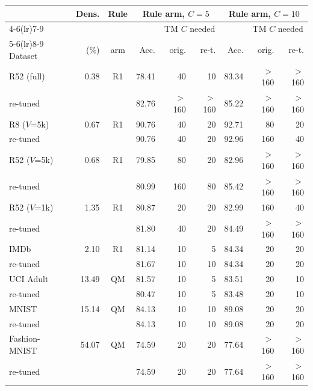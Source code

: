 \begin{tabular}{lrcrrrrrr}
\toprule
 & Dens. & Rule & \multicolumn{3}{c}{Rule arm, $C = 5$} & \multicolumn{3}{c}{Rule arm, $C = 10$} \\
\cmidrule(lr){4-6}\cmidrule(lr){7-9}
 & & & & \multicolumn{2}{c}{TM $C$ needed} & & \multicolumn{2}{c}{TM $C$ needed} \\
\cmidrule(lr){5-6}\cmidrule(lr){8-9}
Dataset & (\%) & arm & Acc. & orig. & re-t. & Acc. & orig. & re-t. \\
\midrule
R52 (full) & 0.38 & R1 & 78.41 & 40 & 10 & 83.34 & $>$160 & $>$160 \\
{\color{blue}\quad re-tuned} &  &  & {\color{blue}82.76} & {\color{blue}$>$160} & {\color{blue}$>$160} & {\color{blue}85.22} & {\color{blue}$>$160} & {\color{blue}$>$160} \\
R8 ($V$=5k) & 0.67 & R1 & 90.76 & 40 & 20 & 92.71 & 80 & 20 \\
{\color{blue}\quad re-tuned} &  &  & {\color{blue}90.76} & {\color{blue}40} & {\color{blue}20} & {\color{blue}92.96} & {\color{blue}160} & {\color{blue}40} \\
R52 ($V$=5k) & 0.68 & R1 & 79.85 & 80 & 20 & 82.96 & $>$160 & $>$160 \\
{\color{blue}\quad re-tuned} &  &  & {\color{blue}80.99} & {\color{blue}160} & {\color{blue}80} & {\color{blue}85.42} & {\color{blue}$>$160} & {\color{blue}$>$160} \\
R52 ($V$=1k) & 1.35 & R1 & 80.87 & 20 & 20 & 82.99 & 160 & 40 \\
{\color{blue}\quad re-tuned} &  &  & {\color{blue}81.80} & {\color{blue}40} & {\color{blue}20} & {\color{blue}84.49} & {\color{blue}$>$160} & {\color{blue}$>$160} \\
IMDb & 2.10 & R1 & 81.14 & 10 & 5 & 84.34 & 20 & 20 \\
{\color{blue}\quad re-tuned} &  &  & {\color{blue}81.67} & {\color{blue}10} & {\color{blue}10} & {\color{blue}84.34} & {\color{blue}20} & {\color{blue}20} \\
UCI Adult & 13.49 & QM & 81.57 & 10 & 5 & 83.51 & 20 & 10 \\
{\color{blue}\quad re-tuned} &  &  & {\color{blue}80.47} & {\color{blue}10} & {\color{blue}5} & {\color{blue}83.48} & {\color{blue}20} & {\color{blue}10} \\
MNIST & 15.14 & QM & 84.13 & 10 & 10 & 89.08 & 20 & 20 \\
{\color{blue}\quad re-tuned} &  &  & {\color{blue}84.13} & {\color{blue}10} & {\color{blue}10} & {\color{blue}89.08} & {\color{blue}20} & {\color{blue}20} \\
Fashion-MNIST & 54.07 & QM & 74.59 & 20 & 20 & 77.64 & $>$160 & $>$160 \\
{\color{blue}\quad re-tuned} &  &  & {\color{blue}74.59} & {\color{blue}20} & {\color{blue}20} & {\color{blue}77.64} & {\color{blue}$>$160} & {\color{blue}$>$160} \\
\bottomrule
\end{tabular}
